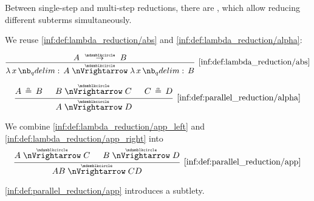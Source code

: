 \begin{definition}\label{def:parallel_reduction}
  Between single-step and multi-step reductions, there are , which allow reducing different subterms simultaneously.

  \begin{thmenum}
     We reuse \ref{inf:def:lambda_reduction/abs} and \ref{inf:def:lambda_reduction/alpha}:
    \begin{paracol}{2}
      \begin{leftcolumn}
        \begin{equation*}\taglabel[\ensuremath{ \logic{ParAbs}_{\Anon} }]{inf:def:parallel_reduction/abs}
          \begin{prooftree}
            \hypo{ A \pred B }
            \infer1[\ref{inf:def:lambda_reduction/abs}]{ \qabs x A \ppred \qabs x B }
          \end{prooftree}
        \end{equation*}
      \end{leftcolumn}

      \begin{rightcolumn}
        \begin{equation*}\taglabel[\ensuremath{ \logic{ParAlpha}_{\Anon} }]{inf:def:parallel_reduction/alpha}
          \begin{prooftree}
            \hypo{ A \aequiv B }
            \hypo{ B \ppred C }
            \hypo{ C \aequiv D }
            \infer3[\ref{inf:def:parallel_reduction/alpha}]{ A \ppred D }.
          \end{prooftree}
        \end{equation*}
      \end{rightcolumn}
    \end{paracol}

    We combine \ref{inf:def:lambda_reduction/app_left} and \ref{inf:def:lambda_reduction/app_right} into
    \begin{equation*}\taglabel[\ensuremath{ \logic{ParApp}_{\Anon} }]{inf:def:parallel_reduction/app}
      \begin{prooftree}
        \hypo{ A \ppred C }
        \hypo{ B \ppred D }
        \infer2[\ref{inf:def:parallel_reduction/app}]{ AB \ppred CD }
      \end{prooftree}
    \end{equation*}

     \ref{inf:def:parallel_reduction/app} introduces a subtlety.


\end{thmenum}
\end{definition}
